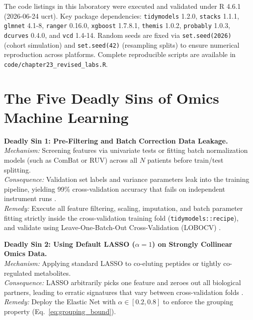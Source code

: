 \documentclass[11pt,oneside]{book}
\begin{document}
\begin{notebox}[top=3pt, bottom=3pt, before skip=3pt, after skip=3pt, title={Computational Environment and Reproducibility Parameters}]
\small
The code listings in this laboratory were executed and validated under R 4.6.1 (2026-06-24 ucrt). Key package dependencies: \texttt{tidymodels} 1.2.0, \texttt{stacks} 1.1.1, \texttt{glmnet} 4.1-8, \texttt{ranger} 0.16.0, \texttt{xgboost} 1.7.8.1, \texttt{themis} 1.0.2, \texttt{probably} 1.0.3, \texttt{dcurves} 0.4.0, and \texttt{vcd} 1.4-14. Random seeds are fixed via \texttt{set.seed(2026)} (cohort simulation) and \texttt{set.seed(42)} (resampling splits) to ensure numerical reproduction across platforms. Complete reproducible scripts are available in \texttt{code/chapter23\_revised\_labs.R}.
\end{notebox}

\clearpage
\section{The Five Deadly Sins of Omics Machine Learning}

\begin{pitfallbox}[top=3pt, bottom=3pt, before skip=3pt, after skip=3pt]
\textbf{Deadly Sin 1: Pre-Filtering and Batch Correction Data Leakage.}\\
\textit{Mechanism:} Screening features via univariate tests or fitting batch normalization models (such as ComBat or RUV) across all $N$ patients before train/test splitting.\\
\textit{Consequence:} Validation set labels and variance parameters leak into the training pipeline, yielding 99\% cross-validation accuracy that fails on independent instrument runs \cite{ambroise2002selection, broadhurst2006statistical}.\\
\textit{Remedy:} Execute all feature filtering, scaling, imputation, and batch parameter fitting strictly inside the cross-validation training fold (\texttt{tidymodels::recipe}), and validate using Leave-One-Batch-Out Cross-Validation (LOBOCV) \cite{kuhn2022tidymodels}.
\end{pitfallbox}

\begin{pitfallbox}[top=3pt, bottom=3pt, before skip=3pt, after skip=3pt]
\textbf{Deadly Sin 2: Using Default LASSO ($\alpha=1$) on Strongly Collinear Omics Data.}\\
\textit{Mechanism:} Applying standard LASSO to co-eluting peptides or tightly co-regulated metabolites.\\
\textit{Consequence:} LASSO arbitrarily picks one feature and zeroes out all biological partners, leading to erratic signatures that vary between cross-validation folds \cite{zou2005regularization}.\\
\textit{Remedy:} Deploy the Elastic Net with $\alpha \in [0.2, 0.8]$ to enforce the grouping property (Eq.~\ref{eq:grouping_bound}).
\end{pitfallbox}
\end{document}

